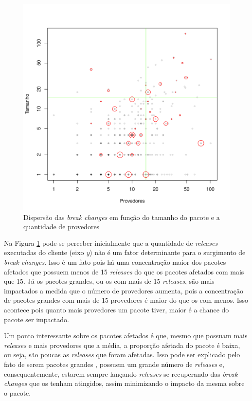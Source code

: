 \begin{figure}
    \centering
    \includegraphics[scale=0.5]{figuras/result_rq1_releases_affecteds.pdf}
    \caption{Dispersão das \textit{break changes} em função do tamanho do pacote e a quantidade de provedores}
    \label{fig:result_rq1_releases_affecteds}
\end{figure}{}

Na Figura \ref{fig:result_rq1_releases_affecteds} pode-se perceber inicialmente que a quantidade de \textit{releases} executadas do cliente (eixo \textit{y}) não é um fator determinante para o surgimento de \textit{break changes}. Isso é um fato pois há uma concentração maior dos pacotes afetados que possuem menos de 15 \textit{releases} do que os pacotes afetados com mais que 15. Já os pacotes grandes, ou os com mais de 15 \textit{releases}, são mais impactados a medida que o número de provedores aumenta, pois a concentração de pacotes grandes com mais de 15 provedores é maior do que os com menos. Isso acontece pois quanto mais provedores um pacote tiver, maior é a chance do pacote ser impactado. 

Um ponto interessante sobre os pacotes afetados é que, mesmo que possuam mais \textit{releases} e mais provedores que a média, a proporção afetada do pacote é baixa, ou seja, são poucas as \textit{releases} que foram afetadas. Isso pode ser explicado pelo fato de serem pacotes grandes , possuem um grande número de \textit{releases} e, consequentemente, estarem sempre lançando \textit{releases} se recuperando das \textit{break changes} que os tenham atingidos, assim minimizando o impacto da mesma sobre o pacote.

